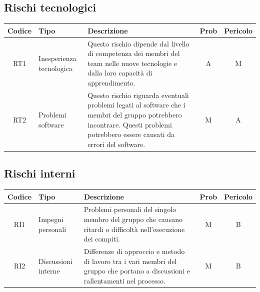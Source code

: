 \documentclass[9pt]{article}
\begin{document}
\subsection{Rischi tecnologici}
\begin{center}
	\small
	\begin{tabularx}{\textwidth}{|c|p{3cm}|X|c|c|}
		\hline
		\textbf{Codice} & \textbf{Tipo}            & \textbf{Descrizione}                                                                                                                                                           & \textbf{Prob} & \textbf{Pericolo} \\
		\hline
		RT1             & Inesperienza tecnologica & Questo rischio dipende dal livello di competenza dei membri del team nelle nuove tecnologie e dalla loro capacità di apprendimento.                                            & A             & M                 \\
		\hline
		RT2             & Problemi software        & Questo rischio riguarda eventuali problemi legati al software che i membri del gruppo potrebbero incontrare. Questi problemi potrebbero essere causati da errori del software. & M             & A                 \\
		\hline
	\end{tabularx}
\end{center}
\subsection{Rischi interni}
\begin{center}
	\small
	\begin{tabularx}{\textwidth}{|c|p{3cm}|X|c|c|}
		\hline
		\textbf{Codice} & \textbf{Tipo}       & \textbf{Descrizione}                                                                                                            & \textbf{Prob} & \textbf{Pericolo} \\
		\hline
		RI1             & Impegni personali   & Problemi personali del singolo membro del gruppo che causano ritardi o difficoltà nell'esecuzione dei compiti.                  & M             & B                 \\
		\hline
		RI2             & Discussioni interne & Differenze di approccio e metodo di lavoro tra i vari membri del gruppo che portano a discussioni e rallentamenti nel processo. & M             & B                 \\
		\hline
	\end{tabularx}
\end{center}
\end{document}
